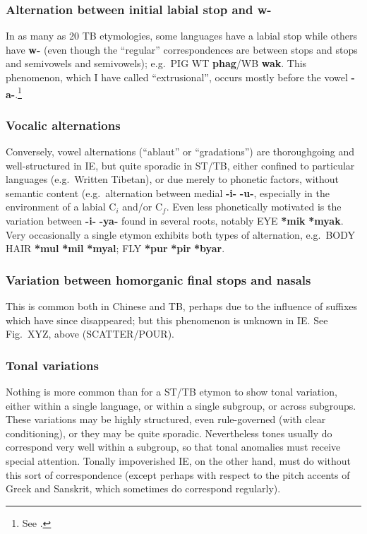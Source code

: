 \subsubsection{Alternation between initial labial stop and w-}
In as many as 20 TB etymologies, some languages have a labial stop while others have \textbf{w-} (even though the “regular” correspondences are between  stops and stops and semivowels and semivowels); e.g.\ PIG WT \textbf{phag}/WB \textbf{wak}. This phenomenon, which I have called “extrusional”, occurs mostly before the vowel \textbf{-a-}.\footnote{See \citealt{JAM-EAPW}.}

\subsubsection{Vocalic alternations}
Conversely, vowel alternations (“ablaut” or “gradations”) are thoroughgoing and well-structured in IE, but quite sporadic in ST/TB, either confined to particular languages (e.g.\ Written Tibetan), or due merely to phonetic factors, without semantic content (e.g.\ alternation between medial \textbf{-i-}  \textbf{-u-}, especially in the environment of a labial $\textrm{C}_i$ and/or $\textrm{C}_f$. Even less phonetically motivated is the variation between \textbf{-i-}  \textbf{-ya-} found in several roots, notably EYE \textbf{*mik}   \textbf{*myak}. Very occasionally a single etymon exhibits both types of alternation, e.g.\ BODY HAIR \textbf{*mul}  \textbf{*mil}   \textbf{*myal}; FLY \textbf{*pur}  \textbf{*pir}  \textbf{*byar}.

\subsubsection{Variation between homorganic final stops and nasals}
This is common both in Chinese and TB, perhaps due to the influence of suffixes which have since disappeared; but this phenomenon is unknown in IE. See Fig.\ XYZ, above (SCATTER/POUR).

\subsubsection{Tonal variations}
Nothing is more common than for a ST/TB etymon to show tonal variation, either within a single language, or within a single subgroup, or across subgroups. These variations may be highly structured, even rule-governed (with clear conditioning), or they may be quite sporadic. Nevertheless tones usually do correspond very well within a subgroup, so that tonal anomalies must receive special attention. Tonally impoverished IE, on the other hand, must do without this sort of correspondence (except perhaps with respect to the pitch accents of Greek and Sanskrit, which sometimes do correspond regularly).

